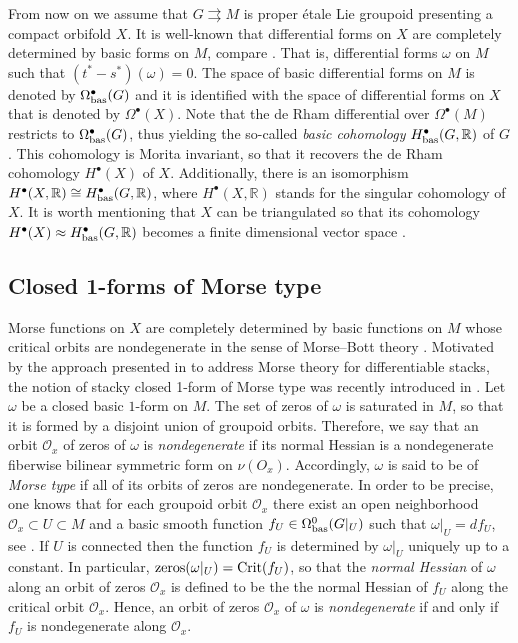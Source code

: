\documentclass[
  a4paper, 
  reqno, 
  oneside, 
  12pt
]{amsart}
\theoremstyle{definition}
\theoremstyle{remark}
\newcommand{\rr}{\rightrightarrows}
\begin{document}
From now on we assume that $G\rr M$ is proper étale Lie groupoid presenting a compact orbifold $X$. It is well-known that differential forms on $X$ are completely determined by basic forms on $M$, compare \cite{PPT,TuX,Wa}. That is, differential forms $\omega$ on $M$ such that $(t^\ast-s^\ast)(\omega)=0$. The space of basic differential forms on $M$ is denoted by $\Omega_{\textnormal{bas}}^\bullet(G)$ and it is identified with the space of differential forms on $X$ that is denoted by $\Omega^\bullet(X)$. Note that the de Rham differential over $\Omega^\bullet(M)$ restricts to $\Omega_{\textnormal{bas}}^\bullet(G)$, thus yielding the so-called \emph{basic cohomology} $H_{\textnormal{bas}}^\bullet(G,\mathbb{R})$ of $G$. This cohomology is Morita invariant, so that it recovers the de Rham cohomology $H^\bullet(X)$ of $X$. Additionally, there is an isomorphism $H^\bullet(X,\mathbb{R})\cong H_{\textnormal{bas}}^\bullet(G,\mathbb{R})$, where $H^\bullet(X,\mathbb{R})$ stands for the singular cohomology of $X$. It is worth mentioning that $X$ can be triangulated so that its cohomology $H^\bullet(X)\approx H_{\textnormal{bas}}^\bullet(G,\mathbb{R})$ becomes a finite dimensional vector space \cite{PPT}.

\subsection{Closed 1-forms of Morse type}

Morse functions on $X$ are completely determined by basic functions on $M$ whose critical orbits are nondegenerate in the sense of Morse--Bott theory \cite{Bo,Hep,OV}. Motivated by the approach presented in \cite{OV} to address  Morse theory for differentiable stacks, the notion of stacky closed 1-form of Morse type was recently introduced in \cite{V}. Let $\omega$ be a closed basic $1$-form on $M$. The set of zeros of $\omega$ is saturated in $M$, so that it is formed by a disjoint union of groupoid orbits. Therefore, we say that an orbit $\mathcal{O}_x$ of zeros of $\omega$ is \emph{nondegenerate} if its normal Hessian is a nondegenerate fiberwise bilinear symmetric form on $\nu(O_x)$. Accordingly, $\omega$ is said to be of \emph{Morse type} if all of its orbits of zeros are nondegenerate. In order to be precise, one knows that for each groupoid orbit $\mathcal{O}_x$ there exist an open neighborhood $\mathcal{O}_x\subset U\subset M$ and a basic smooth function $f_U\in \Omega_{\textnormal{bas}}^0(G|_{U})$ such that $\omega|_U=df_U$, see \cite[Lem. 8.5]{PPT}. If $U$ is connected then the function $f_U$ is determined by $\omega|_U$ uniquely up to a constant. In particular, $\textnormal{zeros}(\omega|_{U})=\textnormal{Crit}(f_U)$, so that the \emph{normal Hessian} of $\omega$ along an orbit of zeros $\mathcal{O}_x$ is defined to be the the normal Hessian of $f_U$ along the critical orbit $\mathcal{O}_x$. Hence, an orbit of zeros $\mathcal{O}_x$ of $\omega$ is \emph{nondegenerate} if and only if $f_U$ is nondegenerate along $\mathcal{O}_x$.
\end{document}

